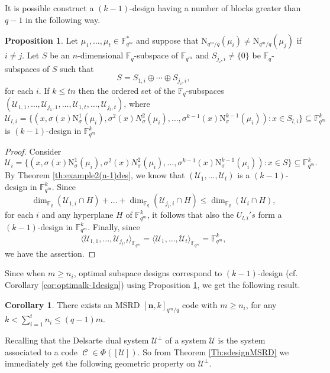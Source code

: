 \documentclass[11pt]{amsart}
\DeclareMathOperator{\C}{\mathcal{C}}
\theoremstyle{definition}
\newtheorem{corollary}[theorem]{Corollary}
\newtheorem{proposition}[theorem]{Proposition}
\newcommand{\F}{{\mathbb F}}
\newcommand{\U}{{\mathcal{U}}}
\newcommand{\bfn}{\mathbf {n}}
\newcommand{\fq}{{\mathbb F}_{q}}
\newcommand{\N}{\mathrm{N}}
\newcommand{\Fmnk}{[\bfn,k]_{q^m/q}}
\begin{document}
It is possible construct a $(k-1)$-design having a number of blocks greater than $q-1$ in the following way.
\begin{proposition} \label{prop:optimaldesignlargerblocks}
    Let $\mu_1,\ldots,\mu_{t} \in \F_{q^m}^*$ and suppose that $\N_{q^m/q}(\mu_i) \neq \N_{q^m/q}(\mu_j)$ if $i \neq j$. Let $S$ be an $n$-dimensional $\F_q$-subspace of $\F_{q^m}$ and $S_{j_i,i} \neq \{0\}$ be $\F_q$-subspaces of $S$ such that 
    \[
    S=S_{1,i} \oplus \cdots \oplus S_{j_i,i}, 
    \]
    for each $i$.
    If $k\leq tn$ then 
    the ordered set of the $\fq$-subspaces $(\U_{1,1},\ldots,\U_{j_1,1},\ldots,\U_{1,t},\ldots,\U_{j_t,t})$, where
    \[
    \U_{l,i}=\{ (x,\sigma(x)\N_{\sigma}^1(\mu_i),\sigma^2(x)N_{\sigma}^2(\mu_i),\ldots, \sigma^{k-1}(x)\N_{\sigma}^{k-1}(\mu_i)) \colon x \in  S_{l,i}\} \subseteq \F_{q^m}^k
    \]
    is $(k-1)$-design in $\F_{q^m}^k$
\end{proposition}

\begin{proof}
    Consider 
    \[
    \U_i=\{ (x,\sigma(x)\N_{\sigma}^1(\mu_i),\sigma^2(x)N_{\sigma}^2(\mu_i),\ldots, \sigma^{k-1}(x)\N_{\sigma}^{k-1}(\mu_i)) \colon x \in  S\} \subseteq \F_{q^m}^k.
    \]
    By Theorem \ref{th:example2(n-1)des}, we know that $(\U_1,\ldots,\U_t)$ is a $(k-1)$-design in $\F_{q^m}^k$. Since 
    \[
    \dim_{\F_q}(\U_{1,i} \cap H)+\ldots +\dim_{\F_q}(\U_{j_i,i} \cap H) \leq \dim_{\F_q}(\U_{i} \cap H),
    \]
    for each $i$ and any hyperplane $H$ of $\F_{q^m}^k$, it follows that also the $U_{l,i}'s$ form a $(k-1)$-design in $\F_{q^m}^k$. Finally, since 
    \[
  \langle \U_{1,1},\ldots,\U_{j_t,t} \rangle_{\F_{q^m}}=\langle \U_{1},\ldots,\U_{t} \rangle_{\F_{q^m}}=\F_{q^m}^k,
    \]
    we have the assertion.
\end{proof}

Since when $m \geq n_i$, optimal subspace designs correspond to $(k-1)$-design (cf. Corollary \ref{cor:optimalk-1design}) using Proposition \ref{prop:optimaldesignlargerblocks}, we get the following result.

\begin{corollary}
    There exists an MSRD $\Fmnk$ code with $m \geq n_i$, for any $k<\sum_{i=1}^t n_i \leq (q-1)m$.
\end{corollary}





Recalling that the Delsarte dual system $\U^{\perp}$ of a system $\U$ is the system associated to a code $\C \in \Phi([\U])$. So from Theorem \ref{Th:sdesignMSRD} we immediately get the following geometric property on $\U^{\perp}$.
\end{document}
